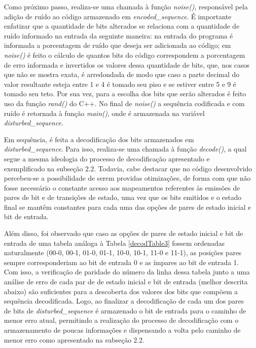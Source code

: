 \documentclass[12pt]{article}
\begin{document}
Como próximo passo, realiza-se uma chamada à função \emph{noise()}, responsável pela adição de ruído ao código armazenado em \emph{encoded\_sequence}. É importante enfatizar que a quantidade de bits alterados se relaciona com a quantidade de ruído informado na entrada da seguinte maneira: na entrada do programa é informada a porcentagem de ruído que deseja ser adicionada ao código; em \emph{noise()} é feito o cálculo de quantos bits do código correspondem a porcentagem de erro informada e invertidos os valores dessa quantidade de bits, que, nos casos que não se mostra exata, é arredondada de modo que caso a parte decimal do valor resultante esteja entre 1 e 4 é tomado seu piso e se estiver entre 5 e 9 é tomado seu teto. Por sua vez, para a escolha dos bits que serão alterados é feito uso da função \emph{rand()} do C++. No final de \emph{noise()} a sequência codificada e com ruído é retornada à função \emph{main()}, onde é armazenada na variável \emph{disturbed\_sequence}.

Em sequência, é feita a decodificação dos bits armazenados em \emph{disturbed\_sequence}. Para isso, realiza-se uma chamada à função \emph{decode()}, a qual segue a mesma ideologia do processo de decodificação apresentado e exemplificado na subseção 2.2. Todavia, cabe destacar que no código desenvolvido percebeu-se a possibilidade de serem providas otimizações, de forma com que não fosse necessário o constante acesso aos mapeamentos referentes às emissões de pares de bit e de transições de estado, uma vez que os bits emitidos e o estado final se mantêm constantes para cada uma das opções de pares de estado inicial e bit de entrada.

Além disso, foi observado que caso as opções de pares de estado inicial e bit de entrada de uma tabela análoga à Tabela \ref{decodTable3} fossem ordenadas naturalmente (00-0, 00-1, 01-0, 01-1, 10-0, 10-1, 11-0 e 11-1), as posições pares sempre corresponderiam ao bit de entrada 0 e as ímpares ao bit de entrada 1. Com isso, a verificação de paridade do número da linha dessa tabela junto a uma análise de erro de cada par de de estado inicial e bit de entrada (melhor descrita abaixo) são suficientes para a descoberta dos valores dos bits que compõem a sequência decodificada. Logo, ao finalizar a decodificação de cada um dos pares de bits de \emph{disturbed\_sequence} é armazenado o bit de entrada para o caminho de menor erro atual, permitindo a realização do processo de decodificação com o armazenamento de poucas informações e dispensando a volta pelo caminho de menor erro como apresentado na subseção 2.2.
\end{document}
